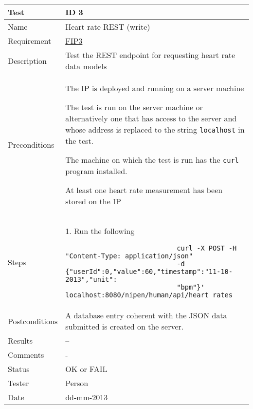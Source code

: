\begin{table}
\begin{center}
\begin{tabular}{ | l | p{10cm} | }
	\hline
	\textbf{Test}	&	\textbf{ID 3} \\
	\hline\noalign{\smallskip}\noalign{\smallskip}\hline
	Name				& Heart rate REST (write) \\
	Requirement			& \hyperref[table:reqip]{FIP3} \\
	Description			& Test the REST endpoint for requesting heart rate data models \\
	Preconditions		&	\par The IP is deployed and running on a server machine
							\par The test is run on the server machine or alternatively
							one that has access to the server and whose address is replaced to the
							string \verb|localhost| in the test.
							\par The machine on which the test is run has the \verb|curl| program installed.
							\par At least one heart rate measurement has been stored on the IP \\
	Steps 				&	1. Run the following \begin{verbatim}
							curl -X POST -H "Content-Type: application/json"
							-d {"userId":0,"value":60,"timestamp":"11-10-2013","unit":
							"bpm"}' localhost:8080/nipen/human/api/heart_rates
							\end{verbatim} \\
	Postconditions		& A database entry coherent with the JSON data submitted is created on the server. \\
	Results				& -- \\
	Comments			& - \\
	Status				& OK or FAIL \\
	Tester				& Person \\
	Date				& dd-mm-2013 \\
	\hline
\end{tabular}
\end{center}
\end{table}

